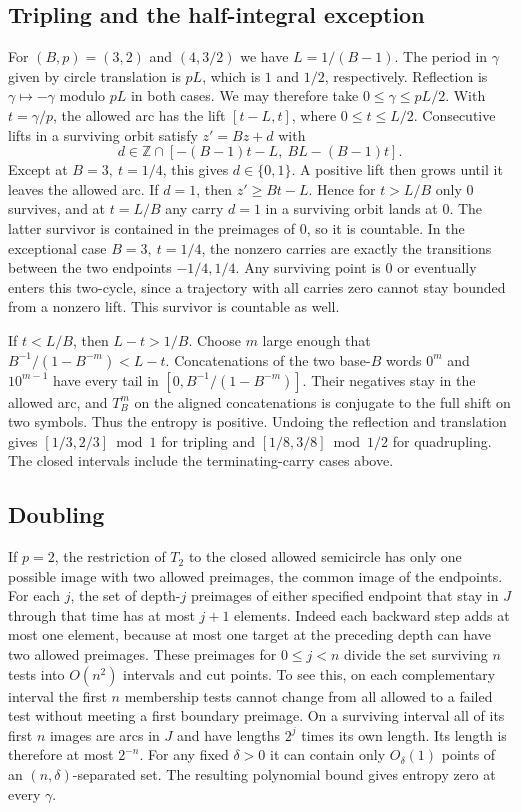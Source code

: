\documentclass[11pt,reqno,a4paper]{amsart}
\theoremstyle{remark}
\begin{document}
\subsection{Tripling and the half-integral exception}

For \((B,p)=(3,2)\) and \((4,3/2)\) we have \(L=1/(B-1)\).
The period in \(\gamma\) given by circle translation is \(pL\),
which is \(1\) and \(1/2\), respectively. Reflection is
\(\gamma\mapsto-\gamma\) modulo \(pL\) in both cases. We may therefore
take \(0\le\gamma\le pL/2\). With \(t=\gamma/p\), the allowed arc has
the lift \([t-L,t]\), where \(0\le t\le L/2\).
Consecutive lifts in a surviving orbit satisfy \(z'=Bz+d\) with
\[
 d\in\mathbb Z\cap[-(B-1)t-L,\ BL-(B-1)t].
\]
Except at \(B=3,\ t=1/4\), this gives \(d\in\{0,1\}\).
A positive lift then grows until it leaves the allowed arc.
If \(d=1\), then \(z'\ge Bt-L\). Hence for \(t>L/B\) only \(0\)
survives, and at \(t=L/B\) any carry \(d=1\) in a surviving orbit
lands at \(0\). The latter survivor is contained in the preimages of
\(0\), so it is countable. In the exceptional case \(B=3,\ t=1/4\),
the nonzero carries are exactly the transitions between the two
endpoints \(-1/4,1/4\). Any surviving point is \(0\) or eventually
enters this two-cycle, since a trajectory with all carries zero
cannot stay bounded from a nonzero lift. This survivor is countable
as well.

If \(t<L/B\), then \(L-t>1/B\). Choose \(m\) large enough that
\(B^{-1}/(1-B^{-m})<L-t\). Concatenations of the two base-\(B\)
words \(0^m\) and \(10^{m-1}\) have every tail in
\([0,B^{-1}/(1-B^{-m})]\). Their negatives stay in the allowed arc,
and \(T_B^m\) on the aligned concatenations is conjugate to the full
shift on two symbols. Thus the entropy is positive. Undoing the
reflection and translation gives \([1/3,2/3]\bmod 1\) for tripling
and \([1/8,3/8]\bmod 1/2\) for quadrupling. The closed intervals
include the terminating-carry cases above.

\subsection{Doubling}

If \(p=2\), the restriction of \(T_2\) to the closed allowed
semicircle has only one possible image with two allowed preimages,
the common image of the endpoints. For each \(j\), the set of
depth-\(j\) preimages of either specified endpoint that stay in \(J\)
through that time has at most \(j+1\) elements. Indeed each
backward step adds at most one element, because at most one target
at the preceding depth can have two allowed preimages. These
preimages for \(0\le j<n\) divide the set surviving \(n\) tests into
\(O(n^2)\) intervals and cut points. To see this, on each complementary
interval the first \(n\) membership tests cannot change from all
allowed to a failed test without meeting a first boundary preimage.
On a surviving interval all of its first \(n\) images are arcs in
\(J\) and have lengths \(2^j\) times its own length. Its length is
therefore at most \(2^{-n}\). For any fixed \(\delta>0\) it can
contain only \(O_\delta(1)\) points of an \((n,\delta)\)-separated
set. The resulting polynomial bound gives entropy zero at every
\(\gamma\).
\end{document}
